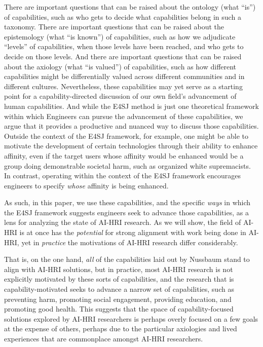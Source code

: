\documentclass[letterpaper]{article} %
\begin{document}
There are important questions that can be raised about the ontology (what ``is'') of capabilities, such as who gets to decide what capabilities belong in such a taxonomy.
There are important questions that can be raised about the epistemology (what ``is known'') of capabilities, such as how we adjudicate ``levels'' of capabilities, when those levels have been reached, and who gets to decide on those levels.
And there are important questions that can be raised about the axiology (what ``is valued'') of capabilities, such as how different capabilities might be differentially valued across different communities and in different cultures. Nevertheless, these capabilities may yet serve as a starting point for a capability-directed discussion of our own field's advancement of human capabilities. And while the E4SJ method is just one theoretical framework within which Engineers can pursue the advancement of these capabilities, we argue that it provides a productive and nuanced way to discuss those capabilities. Outside the context of the E4SJ framework, for example, one might be able to motivate the development of certain technologies through their ability to enhance affinity, even if the target users whose affinity would be enhanced would be a group doing demonstrable societal harm, such as organized white supremacists. In contrast, operating within the context of the E4SJ framework encourages engineers to specify \textit{whose} affinity is being enhanced.

As such, in this paper, we use these capabilities, and the specific \textit{ways} in which the E4SJ framework suggests engineers seek to advance those capabilities, as a lens for analyzing the state of AI-HRI research. As we will show, the field of AI-HRI is at once has the \textit{potential} for strong alignment with work being done in AI-HRI, yet in \textit{practice} the motivations of AI-HRI research differ considerably.

That is, on the one hand, \textit{all} of the capabilities laid out by Nussbaum stand to align with AI-HRI solutions, but in practice, most AI-HRI research is not explicitly motivated by these sorts of capabilities, and the research that is capability-motivated seeks to advance a narrow set of capabilities, such as preventing harm, promoting social engagement, providing education, and promoting good health. This suggests that the space of capability-focused solutions explored by AI-HRI researchers is perhaps overly focused on a few goals at the expense of others, perhaps due to the particular axiologies and lived experiences that are commonplace amongst AI-HRI researchers.
\end{document}
